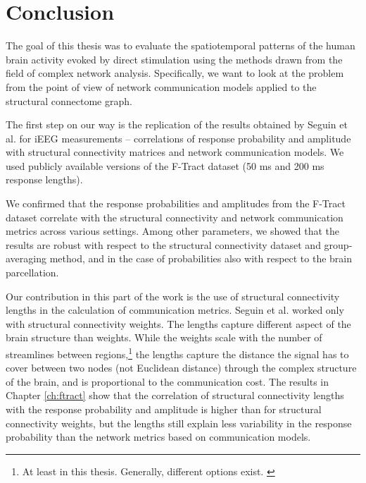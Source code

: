 \chapter*{Conclusion}

The goal of this thesis was to evaluate the spatiotemporal patterns of the human brain activity evoked by direct stimulation using the methods drawn from the field of complex network analysis. Specifically, we want to look at the problem from the point of view of network communication models applied to the structural connectome graph. 

The first step on our way is the replication of the results obtained by Seguin et al. \cite{seguin_communication_2023} for iEEG measurements -- correlations of response probability and amplitude with structural connectivity matrices and network communication models. We used publicly available versions of the F-Tract dataset (50 ms and 200 ms response lengths).

We confirmed that the response probabilities and amplitudes from the F-Tract dataset correlate with the structural connectivity and network communication metrics across various settings. Among other parameters, we showed that the results are robust with respect to the structural connectivity dataset and group-averaging method, and in the case of probabilities also with respect to the brain parcellation. 

Our contribution in this part of the work is the use of structural connectivity lengths in the calculation of communication metrics. Seguin et al. \cite{seguin_communication_2023} worked only with structural connectivity weights. The lengths capture different aspect of the brain structure than weights. While the weights scale with the number of streamlines between regions,\footnote{At least in this thesis. Generally, different options exist. \cite{zhang_quantitative_2022}} the lengths capture the distance the signal has to cover between two nodes (not Euclidean distance) through the complex structure of the brain, and is proportional to the communication cost. The results in Chapter \ref{ch:ftract} show that the correlation of structural connectivity lengths with the response probability and amplitude is higher than for structural connectivity weights, but the lengths still explain less variability in the response probability than the network metrics based on communication models.

